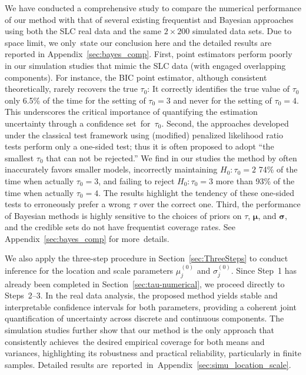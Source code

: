 \documentclass[12pt]{article}
\theoremstyle{shortspace}
\def\*#1{\bm{#1}}
\begin{document}
We have conducted a comprehensive study to compare the numerical performance of our method with that of several existing frequentist and Bayesian approaches using both the SLC real data and the same $2 \times 200$ simulated data sets. Due to space limit, we only~state our conclusion here and the detailed results are reported in  Appendix~\ref{sec:bayes_comp}. First, point estimators perform poorly in our simulation studies that mimic the SLC data (with engaged 
overlapping components).
For instance, 
the BIC point estimator, although consistent theoretically, rarely recovers the true $\tau_0$: It correctly identifies the true value of $\tau_0$ only 6.5\% of the time for the setting of $\tau_0 = 3$ and never for the setting of $\tau_0=4$. This underscores the critical importance of quantifying the estimation uncertainty through a confidence set~for~$\tau_0$. 
Second, the approaches developed under the classical test framework using (modified) penalized likelihood ratio tests \citep[e.g.,][]{roeder_graphical_1994, chen_inference_2012} perform only a one-sided test; thus it is often proposed to adopt ``the smallest $\tau_0$ that can not be rejected.'' We find 
in our studies  
the method by \cite{chen_inference_2012} often inaccurately favors smaller models, incorrectly maintaining $H_0: \tau_0=2$ 74\% of the time when actually $\tau_0 = 3$, and failing to reject $H_0: \tau_0=3$ more than 93\% of the time when actually $\tau_0 = 4$.  The results highlight the tendency of these one-sided tests to erroneously prefer a wrong $\tau$ over the correct one. Third, the performance of Bayesian methods \citep[e.g.,][]{richardson_bayesian_1997} is highly sensitive to the choices of priors on $\tau$, $\*\mu$, and $\*\sigma$,  and the credible sets do not have frequentist coverage rates.  
See Appendix~\ref{sec:bayes_comp} for more~details.

We also apply the three-step procedure in Section~\ref{sec:ThreeSteps} to conduct inference for the location and scale parameters $\mu_j^{(0)}$ and $\sigma_j^{(0)}$. Since Step~1 has already been completed in Section~\ref{sec:tau-numerical}, we proceed directly to Steps~2–3. In the real data analysis, the proposed method yields stable and interpretable confidence intervals for both parameters, providing a coherent joint quantification of uncertainty across discrete and continuous components. The simulation studies further show that our method is the only approach that consistently achieves~the desired empirical coverage for both means and variances, highlighting its robustness and practical reliability, particularly in finite samples. Detailed results are~reported~in~Appendix~\ref{sec:simu_location_scale}.
\end{document}
